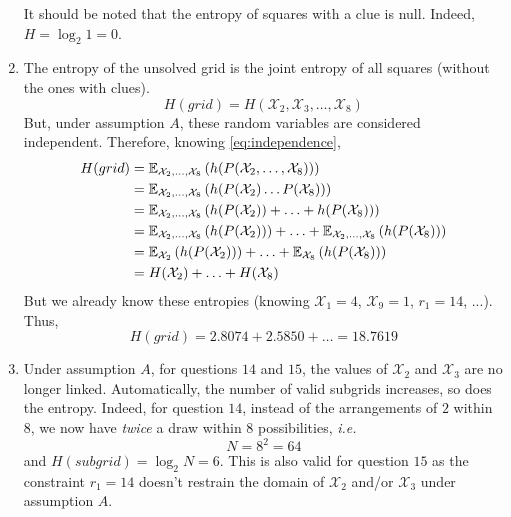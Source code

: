 \documentclass[a4paper, 12pt]{article}
\newcommand{\X}{\mathcal{X}}
\begin{document}
\begin{enumerate}[leftmargin=*]
        \begin{rmk}
            It should be noted that the entropy of squares with a clue is null. Indeed, $H = \log_2 1 = 0$.
        \end{rmk}
        
        \item The entropy of the unsolved grid is the joint entropy of all squares (without the ones with clues).
        \begin{equation}
            H(grid) = H(\X_2, \X_3, \ldots, \X_8)
        \end{equation}
        But, under assumption $A$, these random variables are considered independent. Therefore, knowing \eqref{eq:independence},
        \begin{align}
            H(grid) & = \mathbb{E}_{\X_2, \ldots, \X_8} \rbk{h(P(\X_2, \ldots, \X_8))} \nonumber \\
            & = \mathbb{E}_{\X_2, \ldots, \X_8} \rbk{h(P(\X_2) \ldots P(\X_8))} \nonumber \\
            & = \mathbb{E}_{\X_2, \ldots, \X_8} \rbk{h(P(\X_2)) + \ldots + h(P(\X_8))} \nonumber \\
            & = \mathbb{E}_{\X_2, \ldots, \X_8} \rbk{h(P(\X_2))} + \ldots + \mathbb{E}_{\X_2, \ldots, \X_8} \rbk{h(P(\X_8))} \nonumber \\
            & = \mathbb{E}_{\X_2} \rbk{h(P(\X_2))} + \ldots + \mathbb{E}_{\X_8} \rbk{h(P(\X_8))} \nonumber \\
            & = H(\X_2) + \ldots + H(\X_8) \label{eq:entropy_assumption_A}
        \end{align}
        But we already know these entropies (knowing $\X_1 = 4$, $\X_9 = 1$, $r_1 = 14$, ...). Thus,
        \begin{equation}
            H(grid) = \num{2.8074} + \num{2.5850} + \ldots = \num{18.7619}
        \end{equation}
        
        \item Under assumption $A$, for questions $14$ and $15$, the values of $\X_2$ and $\X_3$ are no longer linked. Automatically, the number of valid subgrids increases, so does the entropy. Indeed, for question $14$, instead of the arrangements of $2$ within $8$, we now have \emph{twice} a draw within $8$ possibilities, \emph{i.e.}
        \begin{equation*}
            N = 8^2 = 64
        \end{equation*}
        and $H(subgrid) = \log_2 N = \num{6}$. This is also valid for question $15$ as the constraint $r_1 = 14$ doesn't restrain the domain of $\X_2$ and/or $\X_3$ under assumption $A$.
        

\end{enumerate}
\end{document}
